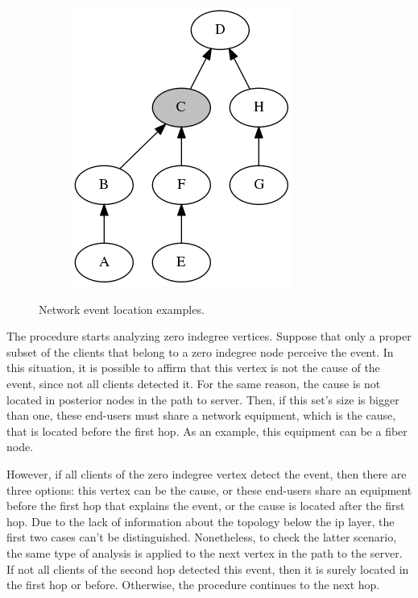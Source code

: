 \begin{figure}[H]
{\begin{subfigure}[b]{0.3\textwidth}
            \includegraphics[width=\textwidth]{./figures/methodology/spatial_time_correlation/event_tree_graph_4.png}
            \caption{}\label{fig:network_events_locations_examples_4}
        \end{subfigure}%
    }
    \caption{Network event location examples.}
\label{fig:network_events_locations_examples}
\end{figure}%

The procedure starts analyzing zero indegree vertices.
Suppose that only a proper subset of the clients that belong to a zero
indegree node perceive the event. In this situation, it is possible to affirm
that this vertex is not the cause of the event, since not all clients detected
it. For the same reason, the cause is not located in posterior nodes
in the path to server.
Then, if this set's size is bigger than one, these end-users must share
a network equipment, which is the cause, that is located before the first hop.
As an example, this equipment can be a fiber node.

However, if all clients of the zero indegree vertex detect the event, then
there are three options:
this vertex can be the cause, or these end-users share an equipment before
the first hop that explains the event,
or the cause is located after the first hop. Due to the
lack of information about the topology below the \gls*{ip} layer, the first two cases
can't be
distinguished. Nonetheless, to check the latter scenario, the same type of
analysis is applied to the next vertex in the path to the server. If not all
clients of the second hop detected this event, then it is surely located
in the first hop or before. Otherwise, the procedure continues to the next hop.

